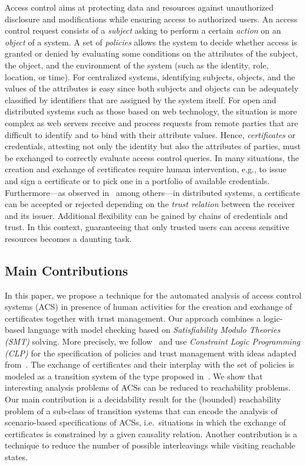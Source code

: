\documentclass[conference]{llncs}
\begin{document}
Access control aims at protecting data and resources against
unauthorized disclosure and modifications while ensuring access to
authorized users. An access control request consists of a
\emph{subject} asking to perform a certain \emph{action} on an
\emph{object} of a system. A set of \emph{policies} allows the system
to decide whether access is granted or denied by evaluating some
conditions on the attributes of the subject, the object, and the
environment of the system (such as the identity, role, location, or
time). For centralized systems, identifying subjects, objects, and the
values of the attributes is easy since both subjects and objects can
be adequately classified by identifiers that are assigned by the
system itself. For open and distributed systems such as those based on
web technology, the situation is more complex as web servers receive
and process requests from remote parties that are difficult to
identify and to bind with their attribute values. Hence,
\emph{certificates} or credentials, attesting not only the identity
but also the attributes of parties, must be exchanged to correctly
evaluate access control queries. In many situations, the creation and
exchange of certificates require human intervention, e.g., to issue
and sign a certificate or to pick one in a portfolio of available
credentials. Furthermore---as observed
in~\cite{beyond-proof-compliance} among others---in distributed
systems, a certificate can be accepted or rejected depending on the
\emph{trust relation} between the receiver and its issuer. Additional
flexibility can be gained by chains of credentials and trust. In this
context, guaranteeing that only trusted users can access sensitive
resources becomes a daunting task.

\subsection{Main Contributions} 

In this paper, we propose a technique for the automated analysis of
access control systems (ACS) in presence of human activities for the creation
and exchange of certificates together with trust management. Our
approach combines a logic-based language with model checking based on
\emph{Satisfiability Modulo Theories (SMT)} solving. More precisely, we
follow~\cite{constraintdatalog} and use \emph{Constraint Logic
Programming (CLP)} for the specification of policies and
trust management with ideas adapted from~\cite{GurevichNeeman-dkal}. The
exchange of certificates and their interplay with the set of policies
is modeled as a transition system of the type proposed
in~\cite{lietal2005}. We show that interesting
analysis problems of ACSs can be reduced to reachability problems.
Our main contribution is a decidability result for the (bounded)
reachability problem of a sub-class of transition systems that can
encode the analysis of scenario-based specifications of ACSs,
 i.e.\ situations in which the exchange of certificates is
constrained by a given causality relation. Another contribution is a
technique to reduce the number of possible interleavings while visiting
reachable states.
\end{document}
